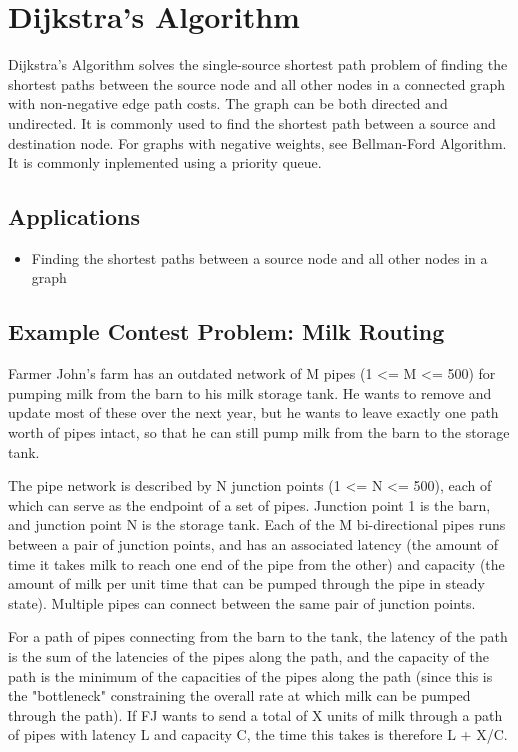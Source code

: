 \section{Dijkstra's Algorithm}
Dijkstra’s Algorithm solves the single-source shortest path problem of finding the shortest paths between the source node and all other nodes in a connected graph with non-negative edge path costs.  
The graph can be both directed and undirected.  
It is commonly used to find the shortest path between a source and destination node.  
For graphs with negative weights, see Bellman-Ford Algorithm.
It is commonly inplemented using a priority queue.

\subsection{Applications}

\begin{itemize}
	\item  Finding the shortest paths between a source node and all other nodes in a graph
\end{itemize}

\subsection{Example Contest Problem: Milk Routing}
Farmer John's farm has an outdated network of M pipes (1 <= M <= 500) for pumping milk from the barn to his milk storage tank.  
He wants to remove and update most of these over the next year, but he wants to leave exactly one path worth of pipes intact, 
so that he can still pump milk from the barn to the storage tank.

The pipe network is described by N junction points (1 <= N <= 500), each of which can serve as the endpoint of a set of pipes.  
Junction point 1 is the barn, and junction point N is the storage tank.  
Each of the M bi-directional pipes runs between a pair of junction points, and has an associated latency 
(the amount of time it takes milk to reach one end of the pipe from the other) and capacity (the amount of milk per unit time
that can be pumped through the pipe in steady state).  
Multiple pipes can connect between the same pair of junction points.

For a path of pipes connecting from the barn to the tank, the latency of the path is the sum of the latencies of the pipes along 
the path, and the capacity of the path is the minimum of the capacities of the pipes along the path (since this is the "bottleneck" 
constraining the overall rate at which milk can be pumped through the path).  
If FJ wants to send a total of X units of milk through a path of pipes with latency L and capacity C, the time this takes is therefore L + X/C.

